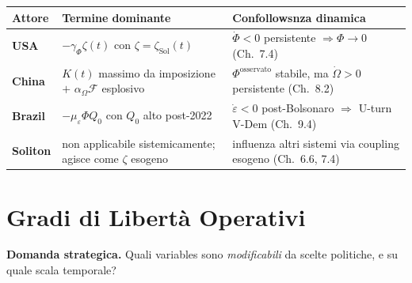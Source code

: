 {\def\LTcaptype{none} %
{\small\begin{longtable}[]{@{}
  >{\raggedright\arraybackslash}p{}
  >{\raggedright\arraybackslash}p{}
  >{\raggedright\arraybackslash}p{}@{}}
\toprule\noalign{}
\begin{minipage}[b]{\linewidth}\raggedright
Attore
\end{minipage} & \begin{minipage}[b]{\linewidth}\raggedright
Termine dominante
\end{minipage} & \begin{minipage}[b]{\linewidth}\raggedright
Confollowsnza dinamica
\end{minipage} \\
\midrule\noalign{}
\endhead
\bottomrule\noalign{}
\endlastfoot
\textbf{USA} & \(-\gamma_\Phi \zeta(t)\) con
\(\zeta = \zeta_{\text{Sol}}(t)\) & \(\dot\Phi < 0\) persistente
\(\Rightarrow \Phi \to 0\) (Ch.~7.4) \\
\textbf{China} & \(K(t)\) massimo da imposizione \(+\)
\(\alpha_\Omega \mathcal{F}\) esplosivo & \(\Phi^{\text{osservato}}\)
stabile, ma \(\dot\Omega > 0\) persistente (Ch.~8.2) \\
\textbf{Brazil} & \(-\mu_\varepsilon \Phi Q_0\) con \(Q_0\) alto
post-2022 & \(\dot\varepsilon < 0\) post-Bolsonaro \(\Rightarrow\)
U-turn V-Dem (Ch.~9.4) \\
\textbf{Soliton} & non applicabile sistemicamente; agisce come
\(\zeta\) esogeno & influenza altri sistemi via coupling esogeno
(Ch.~6.6, 7.4) \\
\end{longtable}}
}



\section{Gradi di Libertà
Operativi}\label{gradi-di-libertuxe0-operativi}

\Hypoth{} \textbf{Domanda strategica.} Quali variables sono
\emph{modificabili} da scelte politiche, e su quale scala temporale?

